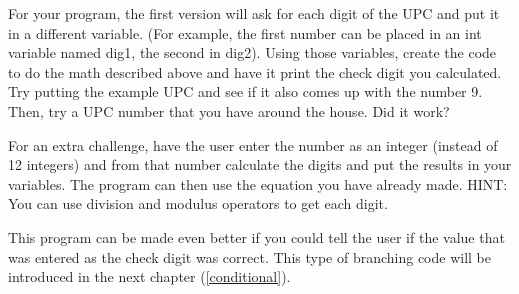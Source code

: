 For your program, the first version will ask for each digit
of the UPC and put it in a different variable. (For example,
the first number can be placed in an int variable named dig1, 
the second in dig2). Using those variables, create the code
to do the math described above and have it print the check
digit you calculated. Try putting the example UPC
and see if it also comes up with the number 9. Then, try a
UPC number that you have around the house. Did it work?

For an extra challenge, have the user enter the number as
an integer (instead of 12 integers) and from that number
calculate the digits and put the results in your variables.
The program can then use the equation you have already made.
HINT: You can use division and modulus operators to get
each digit.

This program can be made even better if you could tell the
user if the value that was entered as the check digit was 
correct. This type of branching code will be introduced in 
the next chapter (\ref{conditional}).
